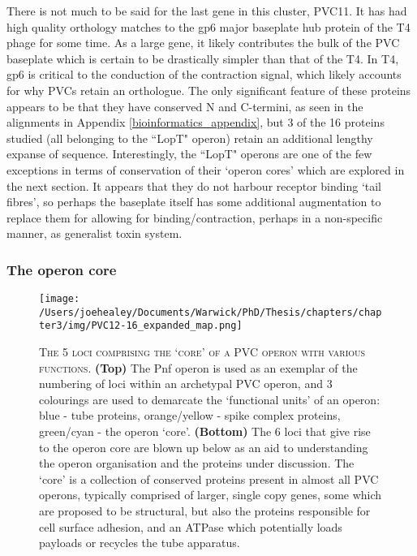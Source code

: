 There is not much to be said for the last gene in this cluster, PVC11. It has had high quality orthology matches to the gp6 major baseplate hub protein of the T4 phage for some time. As a large gene, it likely contributes the bulk of the PVC baseplate which is certain to be drastically simpler than that of the T4. In T4, gp6 is critical to the conduction of the contraction signal, which likely accounts for why PVCs retain an orthologue. The only significant feature of these proteins appears to be that they have conserved N and C-termini, as seen in the alignments in Appendix \vref{bioinformatics_appendix}, but 3 of the 16 proteins studied (all belonging to the ``LopT" operon) retain an additional lengthy expanse of sequence. Interestingly, the ``LopT" operons are one of the few exceptions in terms of conservation of their `operon cores' which are explored in the next section. It appears that they do not harbour receptor binding `tail fibres', so perhaps the baseplate itself has some additional augmentation to replace them for allowing for binding/contraction, perhaps in a non-specific manner, as generalist toxin system.


\clearpage

\subsubsection{The operon core}
\begin{figure}[h!]
\texttt{[image: /Users/joehealey/Documents/Warwick/PhD/Thesis/chapters/chapter3/img/PVC12-16\_expanded\_map.png]}
	\captionsetup{singlelinecheck=off, justification=justified, font=footnotesize, aboveskip=10pt}
	\caption[`Core' protein region of a PVC operon]{\textsc{\normalsize The 5 loci comprising the `core' of a PVC operon with various functions.}\vspace{0.1cm} \newline \textbf{(Top)} The Pnf operon is used as an exemplar of the numbering of loci within an archetypal PVC operon, and 3 colourings are used to demarcate the `functional units' of an operon: blue - tube proteins, orange/yellow - spike complex proteins, green/cyan - the operon `core'. \textbf{(Bottom)} The 6 loci that give rise to the operon core are blown up below as an aid to understanding the operon organisation and the proteins under discussion. The `core' is a collection of conserved proteins present in almost all PVC operons, typically comprised of larger, single copy genes, some which are proposed to be structural, but also the proteins responsible for cell surface adhesion, and an ATPase which potentially loads payloads or recycles the tube apparatus.}
	\label{PVC11-16map}
\end{figure}

